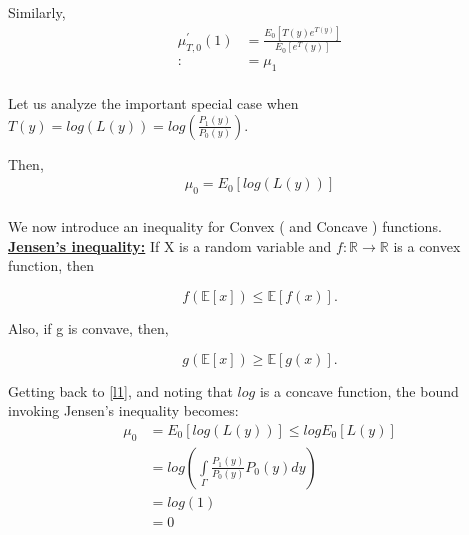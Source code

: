 \documentclass[12pt]{report}
\begin{document}
Similarly,\\


              \begin{equation}
              \begin{aligned}
                   \mu^\prime_{T,0}(1) &= \frac{E_0[T(y)e^{T(y)}]}{E_0[e^T(y)]}\\
                                                     :&=\mu_1\\
              \end{aligned}
              \end{equation}

\noindent Let us analyze the important special case when $T(y)=log(L(y)) = log(\frac{P_1(y)}{P_0(y)})$.

\noindent Then,
            \begin{equation}
            \begin{aligned}
                  \label{l1}
                 \mu_0 = E_0[log(L(y))]\\
            \end{aligned}
           \end{equation}

\noindent We now introduce an inequality for Convex ( and Concave ) functions. \\ 

\noindent\textbf{\underline{Jensen's inequality:}} If X is a random variable and $f:\mathbb{R}\rightarrow \mathbb{R}$ is a convex function, then

         \begin{equation}
             \label{l2}
             f(\mathbb{E}[x])\leq \mathbb{E}[f(x)].
            \end{equation}

\noindent Also, if g is convave, then,


           \begin{equation}
            \label{l3}
         g(\mathbb{E}[x])\geq \mathbb{E}[g(x)].
            \end{equation}


\noindent Getting back to \eqref{l1}, and noting that $log$ is a concave function, the bound invoking Jensen's inequality becomes:  \\


               \begin{equation}
               \begin{aligned}
                  \label{l4}
                  \mu_0 &= E_0[log(L(y))] \leq log E_0[L(y)]\\
                             &= log(\int\limits_\Gamma \frac{P_1(y)}{P_0(y)}P_0(y)dy)\\
                             &= log(1) \\
                             &= 0
                 \end{aligned}
                 \end{equation}
\end{document}
